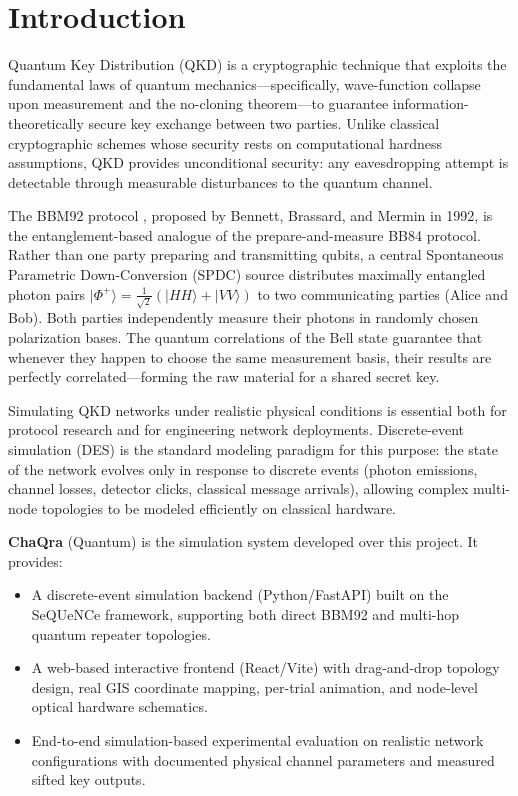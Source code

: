 \documentclass[12pt,oneside,letterpaper,english]{article}
\begin{document}
\section{Introduction}

Quantum Key Distribution (QKD) is a cryptographic technique that exploits the fundamental laws of quantum mechanics—specifically, wave-function collapse upon measurement and the no-cloning theorem—to guarantee information-theoretically secure key exchange between two parties. Unlike classical cryptographic schemes whose security rests on computational hardness assumptions, QKD provides unconditional security: any eavesdropping attempt is detectable through measurable disturbances to the quantum channel.

The BBM92 protocol \cite{BBM92Paper}, proposed by Bennett, Brassard, and Mermin in 1992, is the entanglement-based analogue of the prepare-and-measure BB84 protocol. Rather than one party preparing and transmitting qubits, a central Spontaneous Parametric Down-Conversion (SPDC) source distributes maximally entangled photon pairs $|\Phi^+\rangle = \frac{1}{\sqrt{2}}(|HH\rangle + |VV\rangle)$ to two communicating parties (Alice and Bob). Both parties independently measure their photons in randomly chosen polarization bases. The quantum correlations of the Bell state guarantee that whenever they happen to choose the same measurement basis, their results are perfectly correlated—forming the raw material for a shared secret key.

Simulating QKD networks under realistic physical conditions is essential both for protocol research and for engineering network deployments. Discrete-event simulation (DES) is the standard modeling paradigm for this purpose: the state of the network evolves only in response to discrete events (photon emissions, channel losses, detector clicks, classical message arrivals), allowing complex multi-node topologies to be modeled efficiently on classical hardware.

\textbf{ChaQra} (Quantum) is the simulation system developed over this project. It provides:
\begin{itemize}
    \item A discrete-event simulation backend (Python/FastAPI) built on the SeQUeNCe \cite{SequenceTutorial} framework, supporting both direct BBM92 and multi-hop quantum repeater topologies.
    \item A web-based interactive frontend (React/Vite) with drag-and-drop topology design, real GIS coordinate mapping, per-trial animation, and node-level optical hardware schematics.
    \item End-to-end simulation-based experimental evaluation on realistic network configurations with documented physical channel parameters and measured sifted key outputs.
\end{itemize}
\end{document}
